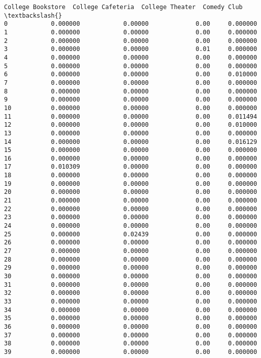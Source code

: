 \documentclass[11pt]{article}
\begin{document}
\begin{tcolorbox}[breakable, size=fbox, boxrule=.5pt, pad at break*=1mm, opacityfill=0]
\begin{Verbatim}[commandchars=\\\{\}]
    College Bookstore  College Cafeteria  College Theater  Comedy Club  \textbackslash{}
0            0.000000            0.00000             0.00     0.000000
1            0.000000            0.00000             0.00     0.000000
2            0.000000            0.00000             0.00     0.000000
3            0.000000            0.00000             0.01     0.000000
4            0.000000            0.00000             0.00     0.000000
5            0.000000            0.00000             0.00     0.000000
6            0.000000            0.00000             0.00     0.010000
7            0.000000            0.00000             0.00     0.000000
8            0.000000            0.00000             0.00     0.000000
9            0.000000            0.00000             0.00     0.000000
10           0.000000            0.00000             0.00     0.000000
11           0.000000            0.00000             0.00     0.011494
12           0.000000            0.00000             0.00     0.010000
13           0.000000            0.00000             0.00     0.000000
14           0.000000            0.00000             0.00     0.016129
15           0.000000            0.00000             0.00     0.000000
16           0.000000            0.00000             0.00     0.000000
17           0.010309            0.00000             0.00     0.000000
18           0.000000            0.00000             0.00     0.000000
19           0.000000            0.00000             0.00     0.000000
20           0.000000            0.00000             0.00     0.000000
21           0.000000            0.00000             0.00     0.000000
22           0.000000            0.00000             0.00     0.000000
23           0.000000            0.00000             0.00     0.000000
24           0.000000            0.00000             0.00     0.000000
25           0.000000            0.02439             0.00     0.000000
26           0.000000            0.00000             0.00     0.000000
27           0.000000            0.00000             0.00     0.000000
28           0.000000            0.00000             0.00     0.000000
29           0.000000            0.00000             0.00     0.000000
30           0.000000            0.00000             0.00     0.000000
31           0.000000            0.00000             0.00     0.000000
32           0.000000            0.00000             0.00     0.000000
33           0.000000            0.00000             0.00     0.000000
34           0.000000            0.00000             0.00     0.000000
35           0.000000            0.00000             0.00     0.000000
36           0.000000            0.00000             0.00     0.000000
37           0.000000            0.00000             0.00     0.000000
38           0.000000            0.00000             0.00     0.000000
39           0.000000            0.00000             0.00     0.000000


\end{Verbatim}
\end{tcolorbox}
\end{document}
